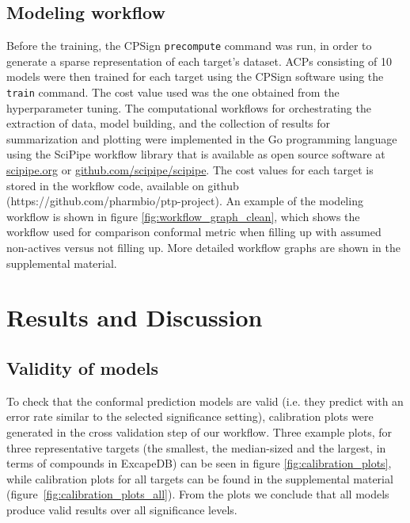 \documentclass[10pt,article]{memoir}
\begin{document}
\subsection{Modeling workflow}
Before the training, the CPSign \texttt{precompute} command was run, in order to
generate a sparse representation of each target's dataset.
ACPs consisting of 10 models were then trained for each target using the CPSign software using the \texttt{train} command.
The cost value used was the one obtained from the hyperparameter tuning. 
The computational workflows for orchestrating the extraction of data, model building, 
and the collection of results for summarization and plotting were
implemented in the Go programming language using the SciPipe workflow library 
that is available as open source software at
\href{http://scipipe.org}{scipipe.org} or \href{https://github.com/scipipe/scipipe}{github.com/scipipe/scipipe}.
The cost values for each target is stored in the workflow code, available on
github (https://github.com/pharmbio/ptp-project).  An example of the modeling
workflow is shown in figure \ref{fig:workflow_graph_clean}, which shows the workflow
used for comparison conformal metric when filling up with assumed non-actives versus
not filling up. More detailed workflow graphs are shown in the supplemental material.





\section*{Results and Discussion}

\subsection{Validity of models}
To check that the conformal prediction models are valid (i.e. they predict with
an error rate similar to the selected significance setting), calibration plots
were generated in the cross validation step of our workflow. Three example
plots, for three representative targets (the smallest, the median-sized and the
largest, in terms of compounds in ExcapeDB) can be seen in figure
\ref{fig:calibration_plots}, while calibration plots for all targets can be
found in the supplemental material (figure~\ref{fig:calibration_plots_all}).
From the plots we conclude that all models produce valid results over all
significance levels.
\end{document}
